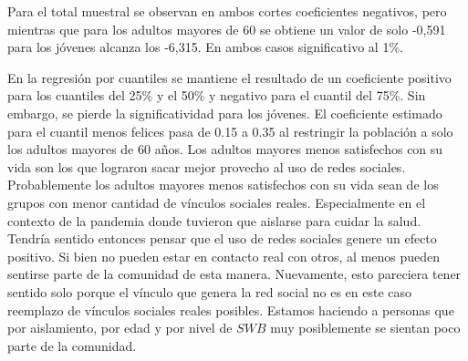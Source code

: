 \documentclass[11pt]{article}
\begin{document}
Para el total muestral se observan en ambos cortes coeficientes negativos, pero mientras que para los adultos mayores de 60 se obtiene un valor de solo -0,591 para los jóvenes alcanza los -6,315. En ambos casos significativo al 1\%. 

En la regresión por cuantiles se mantiene el resultado de un coeficiente positivo para los cuantiles del 25\% y el 50\% y negativo para el cuantil del 75\%. Sin embargo, se pierde la significatividad para los jóvenes. El coeficiente estimado para el cuantil menos felices pasa de 0.15 a 0.35 al restringir la población a solo los adultos mayores de 60 años. Los adultos mayores menos satisfechos con su vida son los que lograron sacar mejor provecho al uso de redes sociales. Probablemente los adultos mayores menos satisfechos con su vida sean de los grupos con menor cantidad de vínculos sociales reales. Especialmente en el contexto de la pandemia donde tuvieron que aislarse para cuidar la salud. Tendría sentido entonces pensar que el uso de redes sociales genere un efecto positivo. Si bien no pueden estar en contacto real con otros, al menos pueden sentirse parte de la comunidad de esta manera. Nuevamente, esto pareciera tener sentido solo porque el vínculo que genera la red social no es en este caso reemplazo de vínculos sociales reales posibles. Estamos haciendo a personas que por aislamiento, por edad y por nivel de $SWB$ muy posiblemente se sientan poco parte de la comunidad.

\begin{table}[htbp]
    \centering
    \caption{Submuestras jóvenes y adultos mayores}
 
\label{CyD}
\end{table}
\end{document}
